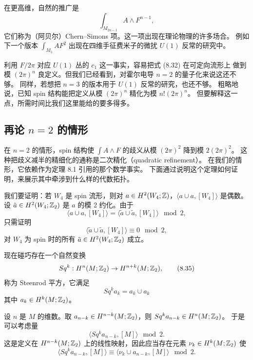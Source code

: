 在更高维，自然的推广是
\begin{equation}
\int_{M_{2n-1}}A\wedge F^{n-1},
\tag{8.32}
\end{equation}
它们称为（阿贝尔）Chern--Simons 项。这一项出现在理论物理的许多场合。
例如下一个版本 $\int_{M_5}AF^2$ 出现在四维手征费米子的微扰 $U(1)$ 反常的研究中。

利用 $F/2\pi$ 对应 $U(1)$ 丛的 $c_1$ 这一事实，容易把式 (8.32) 在可定向流形上
做到模 $(2\pi)^n$ 良定义。但我们已经看到，对霍尔电导 $n=2$ 的量子化来说这还不够。
同样，若想把 $n=3$ 的版本用于 $U(1)$ 反常的研究，也还不够。
粗略地说，已知 spin 结构能把定义从模 $(2\pi)^n$ 精化为模 $n!(2\pi)^n$。
但要解释这一点，所需时间比我们这里能给的要多得多。

\subsection{再论 $n=2$ 的情形}

在 $n=2$ 的情形，spin 结构使 $\int A\wedge F$ 的歧义从模 $(2\pi)^2$ 降到模 $2(2\pi)^2$。
这种把歧义减半的精细化的通称是二次精化（quadratic refinement）。
在我们的情形，它依赖作为定理 8.1 引用的那个数学事实。
下面通过说明这个定理如何证明，来展示其中牵涉到什么样的代数拓扑。

我们要证明：若 $W_4$ 是 spin 流形，则对 $a\in H^2(W_4;\mathbb{Z})$，$\langle a\cup a,[W_4]\rangle$ 是偶数。
设 $\tilde a\in H^2(W_4;\mathbb{Z}_2)$ 是 $a$ 的模 2 约化。由于
\begin{equation}
\langle a\cup a,[W_4]\rangle=\langle\tilde a\cup\tilde a,[W_4]\rangle\mod 2,
\tag{8.33}
\end{equation}
只需证明
\begin{equation}
\langle\tilde a\cup\tilde a,[W_4]\rangle\equiv0\mod 2,
\tag{8.34}
\end{equation}
对 $W_4$ 为 spin 时的所有 $\tilde a\in H^2(W_4;\mathbb{Z}_2)$ 成立。

现在碰巧存在一个自然变换
\begin{equation}
Sq^k:H^n(M;\mathbb{Z}_2)\to H^{n+k}(M;\mathbb{Z}_2),
\tag{8.35}
\end{equation}
称为 Steenrod 平方，它满足
\begin{equation}
Sq^ka_k=a_k\cup a_k
\tag{8.36}
\end{equation}
其中 $a_k\in H^k(M;\mathbb{Z}_2)$。

设 $n$ 是 $M$ 的维数。取 $a_{n-k}\in H^{n-k}(M;\mathbb{Z}_2)$，则 $Sq^ka_{n-k}\in H^n(M;\mathbb{Z}_2)$。
于是可以考虑量
\begin{equation}
\langle Sq^ka_{n-k},[M]\rangle\mod 2.
\tag{8.37}
\end{equation}
这是定义在 $H^{n-k}(M;\mathbb{Z}_2)$ 上的线性映射，因此应当存在元素 $\nu_k\in H^k(M;\mathbb{Z}_2)$ 使
\begin{equation}
\langle Sq^ka_{n-k},[M]\rangle\equiv\langle\nu_k\cup a_{n-k},[M]\rangle\mod 2.
\tag{8.38}
\end{equation}


